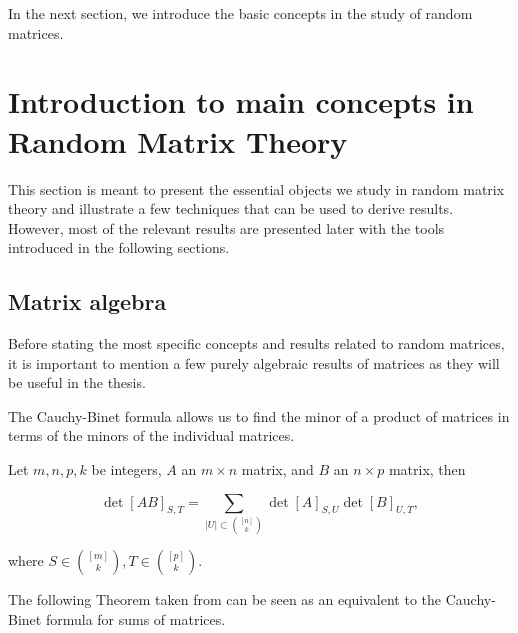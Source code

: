 In the next section, we introduce the basic concepts in the study of random matrices.

\section{Introduction to main concepts in Random Matrix Theory}

This section is meant to present the essential objects we study in random matrix theory and illustrate a few techniques that can be used to derive results. However, most of the relevant results are presented later with the tools introduced in the following sections.



\subsection{Matrix algebra}

Before stating the most specific concepts and results related to random matrices, it is important to mention a few purely algebraic results of matrices as they will be useful in the thesis.

The Cauchy-Binet formula allows us to find the minor of a product of matrices in terms of the minors of the individual matrices.

\begin{theorem} \label{thm:cauchy_binet}
    Let $m,n,p,k$ be integers, $A$ an $m\times n$ matrix, and $B$ an $n\times p$ matrix, then

    \begin{equation*}
        \det[AB]_{S,T} = \sum_{|U|\subset \binom{[n]}{k}} \det[A]_{S,U} \det[B]_{U,T},
    \end{equation*}

    \noindent where $S\in \binom{[m]}{k}, T \in \binom{[p]}{k}$.
\end{theorem}

The following Theorem taken from \cite{article:finitefree} can be seen as an equivalent to the Cauchy-Binet formula for sums of matrices.

